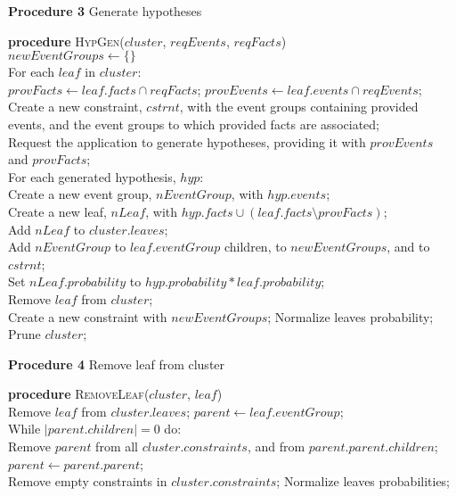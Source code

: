 \procedurespace
\begin{snippet}
\textbf{Procedure 3} Generate hypotheses\\ \hline

\textbf{procedure} \textsc{HypGen}($cluster$, $reqEvents$, $reqFacts$)\\
$newEventGroups \leftarrow \{\}$\\
For each $leaf$ in $cluster$:\\
\tab $provFacts \leftarrow leaf.facts \cap reqFacts$; $provEvents \leftarrow leaf.events \cap reqEvents$;\\
\tab Create a new constraint, $cstrnt$, with the event groups containing provided events, and the event groups to which provided facts are associated;\\
\tab Request the application to generate hypotheses, providing it with $provEvents$ and $provFacts$;\\
\tab For each generated hypothesis, $hyp$:\\
\tab \tab Create a new event group, $nEventGroup$, with $hyp.events$;\\
\tab \tab Create a new leaf, $nLeaf$, with $hyp.facts \cup (leaf.facts\setminus provFacts)$;\\
\tab \tab Add $nLeaf$ to $cluster.leaves$;\\
\tab \tab Add $nEventGroup$ to $leaf.eventGroup$ children, to $newEventGroups$, and to $cstrnt$;\\
\tab \tab Set $nLeaf.probability$ to $hyp.probability * leaf.probability$;\\
\tab Remove $leaf$ from $cluster$;\\
Create a new constraint with $newEventGroups$; Normalize leaves probability; Prune $cluster$;\\
\end{snippet}

\procedurespace
\begin{snippet}
\textbf{Procedure 4} Remove leaf from cluster\\ \hline

\textbf{procedure} \textsc{RemoveLeaf}($cluster$, $leaf$)\\
Remove $leaf$ from $cluster.leaves$; $parent \leftarrow leaf.eventGroup$;\\
While $|parent.children| = 0$ do:\\
\tab Remove $parent$ from all $cluster.constraints$, and from $parent.parent.children$;\\
\tab $parent \leftarrow parent.parent$;\\
Remove empty constraints in $cluster.constraints$; Normalize leaves probabilities;\\
\end{snippet}


